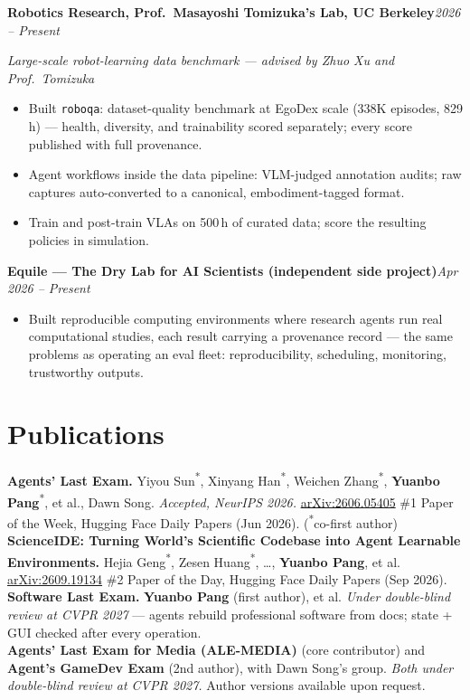 \documentclass[10pt, letterpaper]{article}
\newcommand{\role}[2]{%
  \vspace{4pt}%
  \noindent\textbf{#1}\hfill\textit{#2}\par
}
\newcommand{\rolesub}[1]{%
  \noindent\textit{#1}\par\vspace{1pt}%
}
\begin{document}
\role{Robotics Research, Prof.\ Masayoshi Tomizuka's Lab, UC Berkeley}{2026 -- Present}
\rolesub{Large-scale robot-learning data benchmark --- advised by Zhuo Xu and Prof.\ Tomizuka}
\begin{itemize}
  \item Built \texttt{roboqa}: dataset-quality benchmark at EgoDex scale (338K episodes, 829 h) --- health, diversity, and trainability scored separately; every score published with full provenance.
  \item Agent workflows inside the data pipeline: VLM-judged annotation audits; raw captures auto-converted to a canonical, embodiment-tagged format.
  \item Train and post-train VLAs on 500\,h of curated data; score the resulting policies in simulation.
\end{itemize}

\role{Equile --- The Dry Lab for AI Scientists (independent side project)}{Apr 2026 -- Present}
\begin{itemize}
  \item Built reproducible computing environments where research agents run real computational studies, each result carrying a provenance record --- the same problems as operating an eval fleet: reproducibility, scheduling, monitoring, trustworthy outputs.
\end{itemize}

\section{Publications}
\textbf{Agents' Last Exam.} Yiyou Sun\textsuperscript{*}, Xinyang Han\textsuperscript{*}, Weichen Zhang\textsuperscript{*}, \textbf{Yuanbo Pang}\textsuperscript{*}, et al., Dawn Song. \textit{Accepted, NeurIPS 2026.} \href{https://arxiv.org/abs/2606.05405}{arXiv:2606.05405} \quad \#1 Paper of the Week, Hugging Face Daily Papers (Jun 2026). \quad(\textsuperscript{*}co-first author)\\[3pt]
\textbf{ScienceIDE: Turning World's Scientific Codebase into Agent Learnable Environments.} Hejia Geng\textsuperscript{*}, Zesen Huang\textsuperscript{*}, \ldots, \textbf{Yuanbo Pang}, et al. \href{https://arxiv.org/abs/2609.19134}{arXiv:2609.19134} \quad \#2 Paper of the Day, Hugging Face Daily Papers (Sep 2026).\\[3pt]
\textbf{Software Last Exam.} \textbf{Yuanbo Pang} (first author), et al. \textit{Under double-blind review at CVPR 2027} --- agents rebuild professional software from docs; state + GUI checked after every operation.\\[3pt]
\textbf{Agents' Last Exam for Media (ALE-MEDIA)} (core contributor) and \textbf{Agent's GameDev Exam} (2nd author), with Dawn Song's group. \textit{Both under double-blind review at CVPR 2027.} Author versions available upon request.
\end{document}
